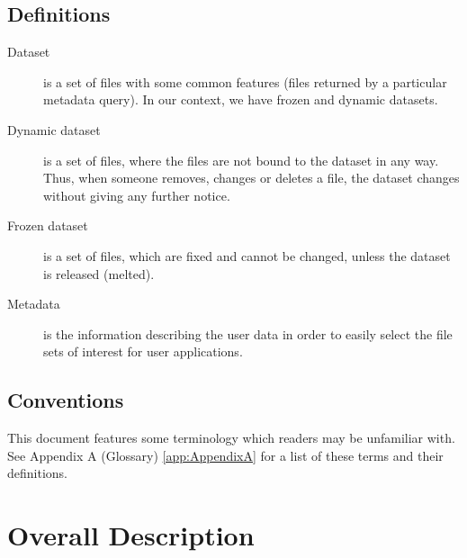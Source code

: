 \documentclass{scrreprt}
\begin{document}
\section{Definitions}
\begin{description}
\item[Dataset] is a set of files with some common features (files returned by a particular metadata query). In our context, we have frozen and dynamic datasets.
\item[Dynamic dataset] is a set of files, where the files are not bound to the dataset in any way. Thus, when someone removes, changes or deletes a file, the dataset changes without giving any further notice.
\item[Frozen dataset] is a set of files, which are fixed and cannot be changed, unless the dataset is released (melted).
\item[Metadata] is the information describing the user data in order to easily select the file sets of interest for user applications.
\end{description}


\section{Conventions}
This document features some terminology which readers may be unfamiliar with. See Appendix A (Glossary) \ref{app:AppendixA} for a list of these terms and their definitions. 



\chapter{Overall Description}
\end{document}
